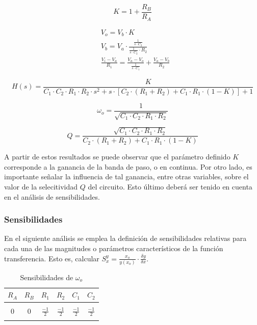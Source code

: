 \begin{equation}
    K = 1 + \frac{R_B}{R_A}
    \label{eq:sallen_key_k}
\end{equation}

\begin{align*}
    & V_o = V_b \cdot K \\
    & V_b = V_a \cdot \frac{\frac{1}{s \cdot C_2}}{\frac{1}{s \cdot C_2} \cdot R_2} \\
    & \frac{V_i - V_a}{R_1} = \frac{V_a - V_o}{\frac{1}{s \cdot C_1}} + \frac{V_a - V_b}{R_2}
\end{align*}

\begin{equation}
    H(s) = \frac{K}{C_1 \cdot C_2 \cdot R_1 \cdot R_2 \cdot s^{2} + s \cdot \left[ C_2 \cdot (R_1 + R_2) + C_1 \cdot R_1 \cdot (1 - K) \right] + 1}
    \label{eq:sallen_key_h}
\end{equation}

\begin{equation}
    \omega_o = \frac{1}{\sqrt{C_1 \cdot C_2 \cdot R_1 \cdot R_2}}
    \label{eq:sallen_key_wo}
\end{equation}

\begin{equation}
    Q = \frac{\sqrt{C_1 \cdot C_2 \cdot R_1 \cdot R_2}}{C_2 \cdot (R_1 + R_2) + C_1 \cdot R_1 \cdot (1 - K)}
    \label{eq:sallen_key_q}
\end{equation}

A partir de estos resultados se puede observar que el par\'ametro definido $K$ corresponde a la ganancia de la banda de paso, o en continua. Por otro lado, es importante
se\~nalar la influencia de tal ganancia, entre otras variables, sobre el valor de la selecitividad $Q$ del circuito. Esto \'ultimo deber\'a ser tenido en cuenta en el an\'alisis de sensibilidades.

\subsubsection{Sensibilidades}
En el siguiente an\'alisis se emplea la definici\'on de sensibilidades relativas para cada una de las magnitudes o par\'ametros caracter\'isticos de la funci\'on transferencia. Esto es,
calcular $S^{y}_x = \frac{x_o}{y(x_o)} \cdot \frac{\delta y}{\delta x}$.

\begin{table}[H]
    \centering
    \begin{tabular}{c c c c c c}
        $R_A$ & $R_B$ & $R_1$ & $R_2$ & $C_1$ & $C_2$ \\
        \hline \\
        $0$ & $0$ & $\frac{-1}{2}$ & $\frac{-1}{2}$ & $\frac{-1}{2}$ & $\frac{-1}{2}$ \\
        \\
        \hline
    \end{tabular}
    \caption{Sensibilidades de $\omega_o$}
\end{table}

